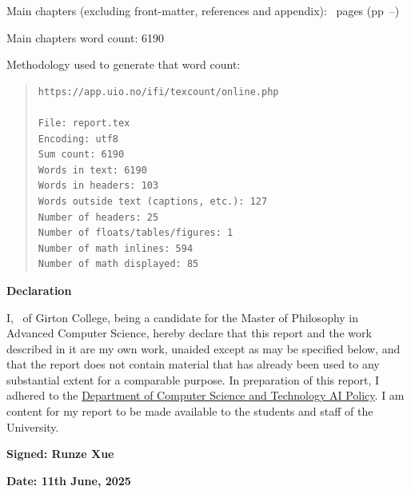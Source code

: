 \documentclass[12pt,a4paper,twoside]{report}
\newif\ifsubmission %
\newcommand{\candidatenumber}{9661I}
\newcommand{\college}{Girton College}
\newcommand{\coursefor}{the Master of Philosophy in Advanced Computer Science}
\begin{document}
\begin{sffamily}
Main chapters (excluding front-matter, references and appendix):
\contentpages~pages
(pp~\pageref{firstcontentpage}--\pageref{lastcontentpage})

Main chapters word count: 6190

Methodology used to generate that word count:

\begin{quote}
\begin{verbatim}
https://app.uio.no/ifi/texcount/online.php

File: report.tex
Encoding: utf8
Sum count: 6190
Words in text: 6190
Words in headers: 103
Words outside text (captions, etc.): 127
Number of headers: 25
Number of floats/tables/figures: 1
Number of math inlines: 594
Number of math displayed: 85
\end{verbatim}
\end{quote}

\end{sffamily}

\vspace{\fill}
\onehalfspacing
\textbf{\Huge Declaration}
\vspace{40pt}

I,
\makeatletter\ifsubmission
\candidatenumber,
\else
\@author\ of \college,
\fi\makeatother
being a candidate for \coursefor, hereby declare that this report and
the work described in it are my own work, unaided except as may be
specified below, and that the report does not contain material that
has already been used to any substantial extent for a comparable
purpose.
In preparation of this report, I adhered to the
\href{https://www.cst.cam.ac.uk/files/ai_policy.pdf}{Department of
Computer Science and Technology AI Policy}. I am content for
my report to be made available to the students and staff of the
University.



\ifsubmission\else
\bigskip
\textbf{Signed: Runze Xue}
\fi

\bigskip
\textbf{Date: 11th June, 2025}
\vspace{\fill}



\ifsubmission\else


\end{document}
